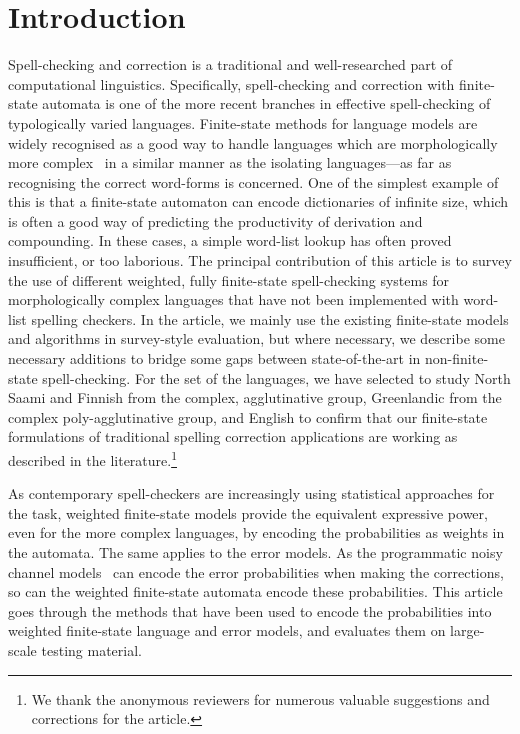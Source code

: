 \documentclass[a4paper,12pt]{article}
\begin{document}
\makeatletter\let\chapter\@undefined\makeatother
\listoftodos

\section{Introduction}

Spell-checking and correction is a traditional and well-researched part of
computational linguistics. Specifically, spell-checking and correction with
finite-state automata is one of the more recent branches in effective
spell-checking of typologically varied languages. Finite-state methods for
language models are widely recognised as a good way to handle languages which are 
morphologically more complex~\cite[]{beesley2003finite} in a similar
manner as the isolating languages---as far as recognising the correct
word-forms is concerned. One of the simplest example of this is that a
finite-state automaton can encode dictionaries of infinite size, which is often
a good way of predicting the productivity of derivation and compounding. In these cases, a simple word-list lookup has often proved
insufficient, or too laborious. The principal contribution of this article
is to survey the use of different weighted, fully finite-state spell-checking
systems for morphologically complex languages that have not been implemented
with word-list spelling checkers. In the article, we mainly use the existing
finite-state models and algorithms in survey-style evaluation, but where
necessary, we describe some necessary additions to bridge some gaps between
state-of-the-art in non-finite-state spell-checking. For the set of the
languages, we have selected to study North Saami and Finnish from the complex,
agglutinative group, Greenlandic from the complex poly-agglutinative group, and
English to confirm that our finite-state formulations of traditional spelling
correction applications are working as described in the literature.\footnote{We thank the anonymous reviewers for numerous valuable suggestions and corrections
for the article.}

As contemporary spell-checkers are increasingly using statistical
approaches for the task, weighted finite-state models provide the equivalent
expressive power, even for the more complex languages, by encoding the
probabilities as weights in the automata. The same applies to the error
models. As the programmatic noisy channel models~\cite[]{brill2000improved} can
encode the error probabilities when making the corrections, so can the weighted
finite-state automata encode these probabilities. This article goes through the
methods that have been used to encode the probabilities into weighted
finite-state language and error models, and evaluates them on large-scale
testing material.
\end{document}
